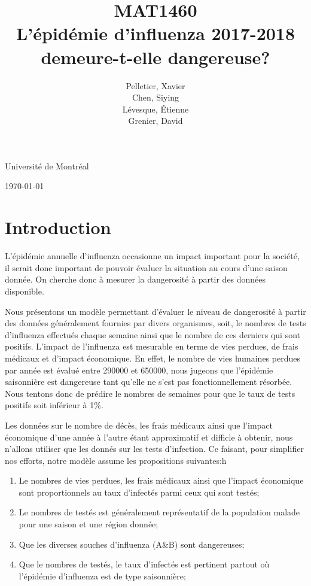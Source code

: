 \documentclass[12pt]{article}
\title{MAT1460\\[3ex]L'\'epid\'emie d'influenza 2017-2018 demeure-t-elle dangereuse?}
\author{Pelletier, Xavier\\[1ex] Chen, Siying\\[1ex]L\'evesque, \'Etienne\\[1ex] Grenier, David}
\date{}
\begin{document}
    \maketitle
    \thispagestyle{empty}
    \vfill
    \begin{center}
    Universit\'e de Montr\'eal

    \today
    \end{center}
    \clearpage

    \section{Introduction}

L'\'epid\'emie annuelle d'influenza occasionne un impact important pour la soci\'et\'e, il serait donc important
de pouvoir \'evaluer la situation au cours d'une saison donn\'ee. On cherche donc \`a mesurer la dangerosit\'e
\`a partir des donn\'ees disponible.

Nous pr\'esentons un mod\`ele permettant d'\'evaluer le niveau de dangerosit\'e \`a partir des donn\'ees g\'en\'eralement
fournies par divers organismes\cite{InfluenzaQC}, soit, le nombres de tests d'influenza effectu\'es chaque semaine ainsi que le nombre
de ces derniers qui sont positifs. L'impact de l'influenza est mesurable en terme de vies perdues, de frais m\'edicaux et d'impact
\'economique\cite{Impact}. En effet, le nombre de vies humaines perdues par ann\'ee est \'evalu\'e
entre 290000 et 650000\cite{Deces},
nous jugeons que l'\'epid\'emie saisonni\`ere est dangereuse tant qu'elle ne s'est pas fonctionnellement r\'esorb\'ee. Nous tentons donc
de pr\'edire le nombres de semaines pour que le taux de tests positifs soit inf\'erieur \`a 1\%.

Les donn\'ees sur le nombre de d\'ec\`es, les frais m\'edicaux ainsi que l'impact \'economique d'une ann\'ee \`a l'autre \'etant approximatif
et difficle \`a obtenir, nous n'allons utiliser que les donn\'es sur les tests d'infection. Ce faisant, pour simplifier nos efforts, notre
mod\`ele assume les propositions suivantes:h

\begin{enumerate}
    \item Le nombres de vies perdues, les frais m\'edicaux ainsi que l'impact \'economique sont proportionnels au taux d'infect\'es parmi ceux qui sont test\'es;
    \item Le nombres de test\'es est g\'en\'eralement repr\'esentatif de la population malade pour une saison et une r\'egion donn\'ee;
    \item Que les diverses souches d'influenza (A\&B) sont dangereuses;
    \item Que le nombres de test\'es, le taux d'infect\'es est pertinent partout o\`u l'\'epid\'emie d'influenza est de type saisonni\`ere;
\end{enumerate}
\clearpage
\end{document}
